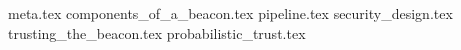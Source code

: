 {meta.tex}
{components_of_a_beacon.tex}
{pipeline.tex}
{security_design.tex}
{trusting_the_beacon.tex}
{probabilistic_trust.tex}

